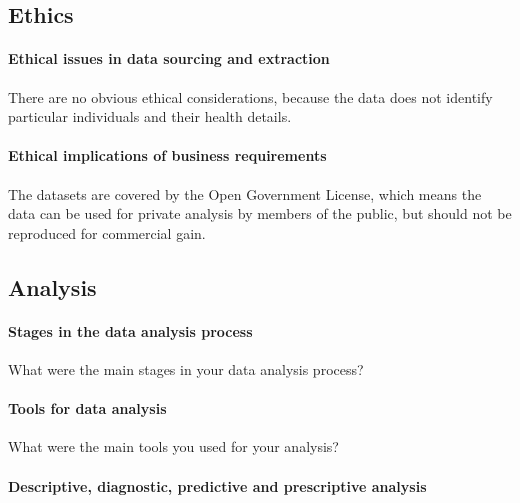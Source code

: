 \documentclass[
]{article}
\begin{document}
\hypertarget{ethics}{%
\subsection{Ethics}\label{ethics}}

\hypertarget{ethical-issues-in-data-sourcing-and-extraction}{%
\paragraph{Ethical issues in data sourcing and
extraction}\label{ethical-issues-in-data-sourcing-and-extraction}}

There are no obvious ethical considerations, because the data does not
identify particular individuals and their health details.

\hypertarget{ethical-implications-of-business-requirements}{%
\paragraph{Ethical implications of business
requirements}\label{ethical-implications-of-business-requirements}}

The datasets are covered by the Open Government License, which means the
data can be used for private analysis by members of the public, but
should not be reproduced for commercial gain.

\hypertarget{analysis}{%
\subsection{Analysis}\label{analysis}}

\hypertarget{stages-in-the-data-analysis-process}{%
\paragraph{Stages in the data analysis
process}\label{stages-in-the-data-analysis-process}}

What were the main stages in your data analysis process?

\hypertarget{tools-for-data-analysis}{%
\paragraph{Tools for data analysis}\label{tools-for-data-analysis}}

What were the main tools you used for your analysis?

\hypertarget{descriptive-diagnostic-predictive-and-prescriptive-analysis}{%
\paragraph{Descriptive, diagnostic, predictive and prescriptive
analysis}\label{descriptive-diagnostic-predictive-and-prescriptive-analysis}}
\end{document}
